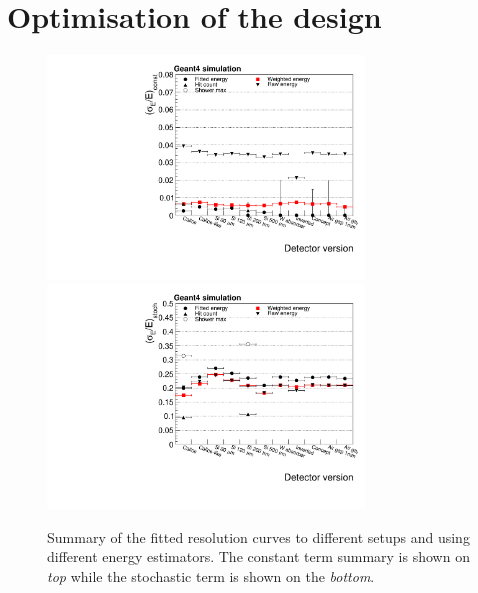 %
%
%
\clearpage
\section{Optimisation of the design}
\label{sec:optim}







\begin{figure}[h!]
  \begin{center}
  \includegraphics[width=0.75\textwidth]{figures/ResolutionSummary_const}\\
  \includegraphics[width=0.75\textwidth]{figures/ResolutionSummary_stochastic}
  \caption{Summary of the fitted resolution curves to different
    setups and using different energy estimators. The constant term
    summary is shown on {\em top} while the stochastic term is
    shown on the {\em bottom}. }
    \label{fig:resol_summary}
  \end{center}
\end{figure}